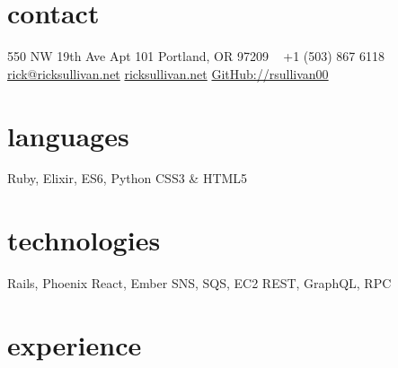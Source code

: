 \documentclass[]{friggeri-cv} %
\begin{document}


\begin{aside} %
\section{contact}
550 NW 19th Ave
Apt 101
Portland, OR 97209
~
+1 (503) 867 6118
~
\href{mailto:rick@ricksullivan.net}{rick@ricksullivan.net}
\href{https://ricksullivan.net}{ricksullivan.net}
\href{https://github.com/rsullivan00}{GitHub://rsullivan00}
%
\section{languages}
Ruby, Elixir, ES6, Python
CSS3 \& HTML5
%
\section{technologies}
Rails, Phoenix
React, Ember
SNS, SQS, EC2
REST, GraphQL, RPC
\end{aside}

\section{experience}
\end{document}
